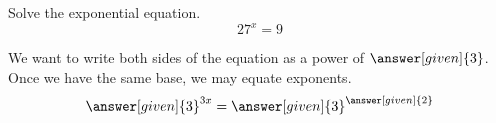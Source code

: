 \documentclass{ximera}
\begin{document}
 \begin{example}
Solve the exponential equation.
\[
27^x=9
\]
\end{example}
 \begin{explanation}
We want to write both sides of the equation as a power of $\answer[given]{3}$.  Once we have the same base, we may equate exponents.
 \[
\answer[given]{3}^{3x}=\answer[given]{3}^{\answer[given]{2}}
\]
\end{explanation}
 
 
\end{document}
